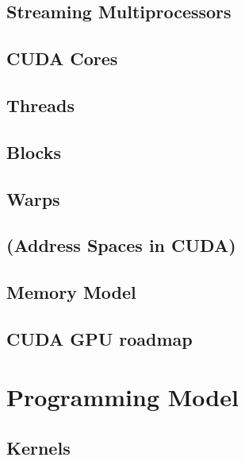 \documentclass[12px,oz]{report}
\begin{document}
	\section{Streaming Multiprocessors}
	\label{sec:hw-streaming-multiprocessors}
	

	\section{CUDA Cores}
	\label{sec-hw-cuda-cores}
	

	\section{Threads}
	\label{sec:HW-Threads}
	

	\section{Blocks}
	\label{sec-hw-blocks}
	

	\section{Warps}
	\label{sec-hw-warps}
	

	\section{(Address Spaces in CUDA)}

	\section{Memory Model}
	\label{sec-hw-memory-model}
	

	\section{CUDA GPU roadmap}
	\label{sec-hw-cuda-gpu-roadmap}
	


\chapter{Programming Model}
\label{ch-programming-model}


	\section{Kernels}
	\label{sec-pm-kernels}
	
\end{document}

